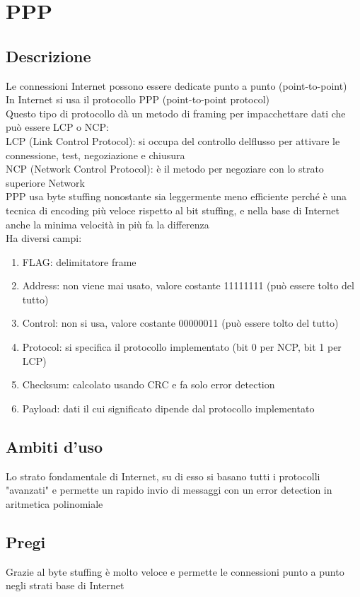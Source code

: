 \documentclass[10pt,oneside,a4paper]{article}
\begin{document}
\section{PPP}
\subsection{Descrizione}
Le connessioni Internet possono essere dedicate punto a punto (point-to-point)\\
In Internet si usa il protocollo PPP (point-to-point protocol)\\
Questo tipo di protocollo dà un metodo di framing per impacchettare dati che può essere LCP o NCP:\\
LCP (Link Control Protocol): si occupa del controllo delflusso per attivare le connessione, test, negoziazione e chiusura\\
NCP (Network Control Protocol): è il metodo per negoziare con lo strato superiore Network\\
PPP usa byte stuffing nonostante sia leggermente meno efficiente perché è una tecnica di encoding più veloce rispetto al bit stuffing, e nella base di Internet anche la minima velocità in più fa la differenza\\
Ha diversi campi:
\begin{enumerate}
\item FLAG: delimitatore frame
\item Address: non viene mai usato, valore costante 11111111 (può essere tolto del tutto)
\item Control: non si usa, valore costante 00000011 (può essere tolto del tutto)
\item Protocol: si specifica il protocollo implementato (bit 0 per NCP, bit 1 per LCP)
\item Checksum: calcolato usando CRC e fa solo error detection
\item Payload: dati il cui significato dipende dal protocollo implementato
\end{enumerate}
\subsection{Ambiti d'uso}
Lo strato fondamentale di Internet, su di esso si basano tutti i protocolli "avanzati" e permette un rapido invio di messaggi con un error detection in aritmetica polinomiale
\subsection{Pregi}
Grazie al byte stuffing è molto veloce e permette le connessioni punto a punto negli strati base di Internet
\end{document}
